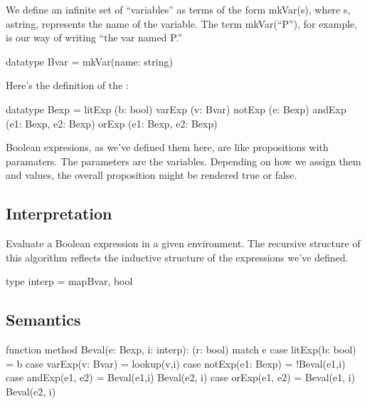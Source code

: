 \documentclass[letterpaper,10pt,english]{sphinxmanual}
\begin{document}
We define an infinite set of “variables” as terms of the form
mkVar(s), where s, astring, represents the name of the variable. The
term mkVar(“P”), for example, is our way of writing “the var named P.”

\begin{sphinxVerbatim}[commandchars=\\\{\}]
datatype Bvar = mkVar(name: string)
\end{sphinxVerbatim}

Here’s the definition of the :

\begin{sphinxVerbatim}[commandchars=\\\{\}]
datatype Bexp =
    litExp (b: bool) \textbar{}
    varExp (v: Bvar) \textbar{}
    notExp (e: Bexp) \textbar{}
    andExp (e1: Bexp, e2: Bexp) \textbar{}
    orExp (e1: Bexp, e2: Bexp)
\end{sphinxVerbatim}

Boolean expresions, as we’ve defined them here, are like propositions
with paramaters. The parameters are the variables. Depending on how we
assign them  and  values, the overall proposition might be
rendered true or false.


\subsection{Interpretation}
\label{\detokenize{09-propositional-logic:interpretation}}
Evaluate a Boolean expression in a given environment.  The recursive
structure of this algorithm reflects the inductive structure of the
expressions we’ve defined.

\begin{sphinxVerbatim}[commandchars=\\\{\}]
type interp = map\PYGZlt{}Bvar, bool\PYGZgt{}
\end{sphinxVerbatim}


\subsection{Semantics}
\label{\detokenize{09-propositional-logic:semantics}}
\begin{sphinxVerbatim}[commandchars=\\\{\}]
function method Beval(e: Bexp, i: interp): (r: bool)
\PYGZob{}
    match e
    \PYGZob{}
        case litExp(b: bool) =\PYGZgt{} b
        case varExp(v: Bvar) =\PYGZgt{} lookup(v,i)
        case notExp(e1: Bexp) =\PYGZgt{} !Beval(e1,i)
        case andExp(e1, e2) =\PYGZgt{} Beval(e1,i) \PYGZam{}\PYGZam{} Beval(e2, i)
        case orExp(e1, e2) =\PYGZgt{}  Beval(e1, i) \textbar{}\textbar{} Beval(e2, i)
    \PYGZcb{}
\PYGZcb{}
\end{sphinxVerbatim}
\end{document}

